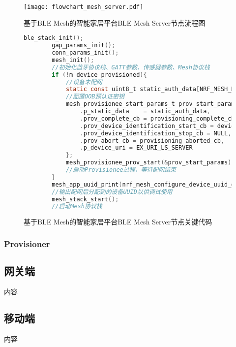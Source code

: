 \begin{figure}[H]
    \centering
    \texttt{[image: flowchart\_mesh\_server.pdf]}
    \caption{基于BLE Mesh的智能家居平台BLE Mesh Server节点流程图}
    \label{fig:flowchart_mesh_server}
\end{figure}

\begin{figure}[H]
    \centering
    \begin{lstlisting}[language=C]
        ble_stack_init();
        gap_params_init();
        conn_params_init();
        mesh_init();
        //初始化蓝牙协议栈、GATT参数、传感器参数、Mesh协议栈
        if (!m_device_provisioned){
            //设备未配网
            static const uint8_t static_auth_data[NRF_MESH_KEY_SIZE] = STATIC_AUTH_DATA;
            //配置OOB预认证密钥
            mesh_provisionee_start_params_t prov_start_params = {
                .p_static_data    = static_auth_data,
                .prov_complete_cb = provisioning_complete_cb,
                .prov_device_identification_start_cb = device_identification_start_cb,
                .prov_device_identification_stop_cb = NULL,
                .prov_abort_cb = provisioning_aborted_cb,
                .p_device_uri = EX_URI_LS_SERVER
            };
            mesh_provisionee_prov_start(&prov_start_params);
            //启动Provisionee过程，等待配网结束
        }
        mesh_app_uuid_print(nrf_mesh_configure_device_uuid_get());
        //输出配网后分配到的设备UUID以供调试使用
        mesh_stack_start();
        //启动Mesh协议栈
    \end{lstlisting}
    \caption{基于BLE Mesh的智能家居平台BLE Mesh Server节点关键代码}
    \label{fig:code_mesh_server}
\end{figure}

\subsubsection{Provisioner}

\subsection{网关端}
内容

\subsection{移动端}
内容
